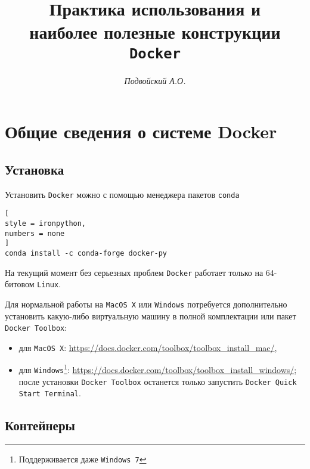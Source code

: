 \documentclass[%
	11pt,
	a4paper,
	utf8,
		]{article}
\begin{document}
\title{Практика использования и \\наиболее полезные конструкции \texttt{Docker}}

\author{\itshape Подвойский А.О.}

\date{}
\maketitle

\thispagestyle{fancy}

\tableofcontents

\section{Общие сведения о системе Docker}

\subsection{Установка}

Установить \texttt{Docker} можно с помощью менеджера пакетов \texttt{conda}

\begin{lstlisting}[
style = ironpython,
numbers = none
]
conda install -c conda-forge docker-py
\end{lstlisting}

На текущий момент без серьезных проблем \texttt{Docker} работает только на 64-битовом \texttt{Linux}.

Для нормальной работы на \texttt{MacOS X} или \texttt{Windows} потребуется дополнительно установить какую-либо виртуальную машину в полной комплектации или пакет \texttt{Docker Toolbox}:

\begin{itemize}
	\item для \texttt{MacOS X}: \url{https://docs.docker.com/toolbox/toolbox_install_mac/},
	
	\item для \texttt{Windows}\footnote{Поддерживается даже \texttt{Windows 7}}: \url{https://docs.docker.com/toolbox/toolbox_install_windows/}; после установки \texttt{Docker Toolbox} останется только запустить \texttt{Docker Quick Start Terminal}.
\end{itemize}

\subsection{Контейнеры}
\end{document}
